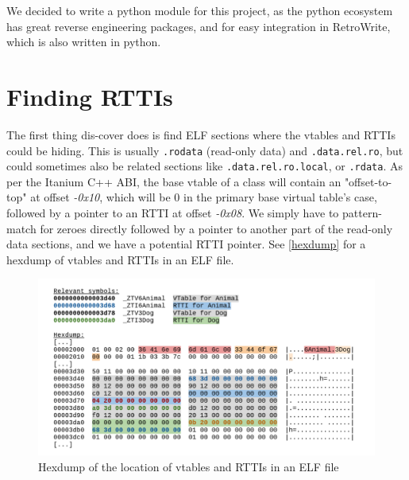 \documentclass[a4paper,11pt,oneside]{report}
\begin{document}


We decided to write a python module for this project, as the python ecosystem 
has great reverse engineering packages, and for easy integration in RetroWrite, 
which is also written in python.


\section{Finding RTTIs}

The first thing dis-cover does is find ELF sections where the vtables and RTTIs 
could be hiding.
This is usually \texttt{.rodata} (read-only data) and \texttt{.data.rel.ro}, 
but could sometimes also be related sections like \texttt{.data.rel.ro.local}, 
or \texttt{.rdata}.
As per the Itanium C++ ABI, the base vtable of a class will contain an 
"offset-to-top" at offset \emph{-0x10}, which will be 0 in the primary base 
virtual table's case, followed by a pointer to an RTTI at offset
\emph{-0x08}.
We simply have to pattern-match for zeroes directly followed by a pointer to 
another part of the read-only data sections, and we have a potential RTTI 
pointer. See \autoref{hexdump} for a hexdump of vtables and RTTIs in an ELF
file.

\begin{figure}

\includegraphics[width=16cm]{hexdump.png}
\caption{Hexdump of the location of vtables and RTTIs in an ELF file}
\label{hexdump}

\end{figure}
\end{document}
